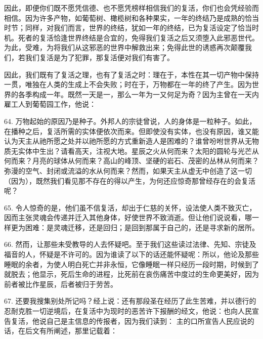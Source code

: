 因此，即便你们既不愿凭信德、也不愿凭榜样相信我们的复活，你们也会凭经验而相信。因为许多产物，如葡萄树、橄榄树和各种果实，一年的终结乃是成熟的恰当时节；同样，对我们而言，世界的终结，犹如一年的终结，已为复活设定了恰当时机。死者的复活恰逢世界终结是合宜的，免得我们复活之后又须堕入此邪恶世代。为此，受难，为将我们从这邪恶的世界中解救出来；免得此世的诱惑再次颠覆我们，若我们复活是为了犯罪，那复活便对我们有害了。\par

因此，我们既有了复活之理，也有了复活之时：理在于，本性在其一切产物中保持一贯，唯独在人类的生成上不会失败；时在于，万物都在一年的终了产生。因为世界的各季构成一年。既然一天是一，那么一年为一又何足为奇？因为主曾在一天内雇工人到葡萄园工作，他说： \par

64. 万物起始的原因乃是种子。外邦人的宗徒曾说，人的身体是一粒种子。如此，在播种之后，复活所需的实体便依次而来。但即使没有实体，也没有原因，谁又能认为天主从祂所愿之处并以祂所愿的方式重新造人是困难的？谁曾吩咐世界从无物质无实体中生出？请看高天，注视大地。星辰之火从何而来？太阳的圆轮与光芒从何而来？月亮的球体从何而来？高山的峰顶、坚硬的岩石、茂密的丛林从何而来？弥漫的空气、封闭或流溢的水从何而来？然而，如果天主从虚无中创造了这一切（因为），既然我们看见那不存在的得以产生，为何还应惊奇那曾经存在的会复活呢？\par

65. 令人惊奇的是，他们虽不信复活，却出于仁慈的关怀，设法使人类不致灭亡，因而主张灵魂会传递并迁入其他身体，好使世界不致消逝。但让他们说说看，哪一样更为困难：是灵魂迁移，还是回归；是回到那属于自己的，还是寻求新的居所。\par

66. 然而，让那些未受教导的人去怀疑吧。至于我们这些读过法律、先知、宗徒及福音的人，怀疑是不许可的。因为谁读了以下的话还能怀疑呢：所以，他论及那些睡眠的余者，为使人明白死亡并非永恒，它像睡眠一样只经历一段时期，时候到了就脱去；他显示，死后生命的进程，比死前在哀伤痛苦中度过的生命更美好，因为前者被比作星辰，后者被归于劳苦。\par

67. 还要我搜集别处所记吗？经上说：还有那段圣在经历了此生苦难，并以德行的忍耐克胜一切逆境后，在复活中为现时的恶苦许下报酬的经文，他说：也向人民宣告复活，他说自己是主信息的传报者，因为我们读到： 主的口所宣告人民应说的话，在后文有所阐述，那里记载着：\par

